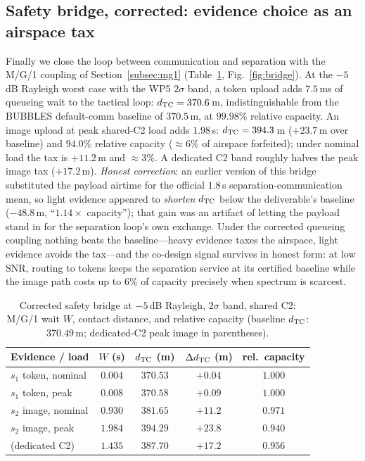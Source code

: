 \subsection{Safety bridge, corrected: evidence choice as an airspace tax}
\label{sub:bridge}
Finally we close the loop between communication and separation with the
M/G/1 coupling of Section~\ref{subsec:mg1}
(Table~\ref{tab:bridge}, Fig.~\ref{fig:bridge}). At the $-5$\,dB Rayleigh
worst case with the WP5 $2\sigma$ band, a token upload adds $7.5$\,ms of
queueing wait to the tactical loop: $d_{\mathrm{TC}}=370.6$\,m, indistinguishable
from the BUBBLES default-comm baseline of $370.5$\,m, at $99.98\%$
relative capacity. An image upload at peak shared-C2 load adds $1.98$\,s:
$d_{\mathrm{TC}}=394.3$\,m ($+23.7$\,m over baseline) and $94.0\%$ relative capacity
($\approx\!6\%$ of airspace forfeited); under nominal load the tax is
$+11.2$\,m and $\approx\!3\%$. A dedicated C2 band roughly $\!$halves the
peak image tax ($+17.2$\,m). \emph{Honest correction}: an earlier version
of this bridge substituted the payload airtime for the official $1.8$\,s
separation-communication mean, so light evidence appeared to
\emph{shorten} $d_{\mathrm{TC}}$ below the deliverable's baseline ($-48.8$\,m,
``$1.14\times$ capacity''); that gain was an artifact of letting the
payload stand in for the separation loop's own exchange. Under the
corrected queueing coupling nothing beats the baseline---heavy evidence
taxes the airspace, light evidence avoids the tax---and the co-design
signal survives in honest form: at low SNR, routing to tokens keeps the
separation service at its certified baseline while the image path costs
up to $6\%$ of capacity precisely when spectrum is scarcest.

\begin{table}[t]
\centering
\caption{Corrected safety bridge at $-5$\,dB Rayleigh, $2\sigma$ band,
shared C2: M/G/1 wait $W$, contact distance, and relative capacity
(baseline $d_{\mathrm{TC}}$: $370.49$\,m; dedicated-C2 peak image in parentheses).}
\label{tab:bridge}
\footnotesize
\setlength{\tabcolsep}{4pt}
\begin{tabular}{@{}lcccc@{}}
\toprule
Evidence / load & $W$ (s) & $d_{\mathrm{TC}}$ (m) & $\Delta d_{\mathrm{TC}}$ (m) & rel.\ capacity \\
\midrule
$s_1$ token, nominal & $0.004$ & $370.53$ & $+0.04$ & $1.000$ \\
$s_1$ token, peak    & $0.008$ & $370.58$ & $+0.09$ & $1.000$ \\
$s_2$ image, nominal & $0.930$ & $381.65$ & $+11.2$ & $0.971$ \\
$s_2$ image, peak    & $1.984$ & $394.29$ & $+23.8$ & $0.940$ \\
\;\;(dedicated C2)   & $1.435$ & $387.70$ & $+17.2$ & $0.956$ \\
\bottomrule
\end{tabular}
\end{table}

